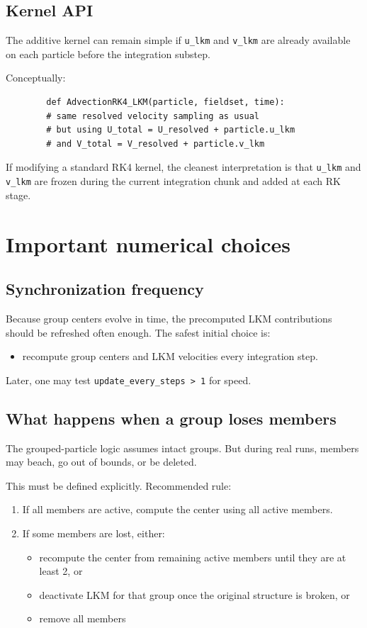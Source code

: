 \documentclass[11pt,a4paper]{article}
\begin{document}
	\subsection{Kernel API}
	
	The additive kernel can remain simple if \texttt{u\_lkm} and \texttt{v\_lkm} are already available on each particle before the integration substep.
	
	Conceptually:
	\begin{verbatim}
		def AdvectionRK4_LKM(particle, fieldset, time):
		# same resolved velocity sampling as usual
		# but using U_total = U_resolved + particle.u_lkm
		# and V_total = V_resolved + particle.v_lkm
	\end{verbatim}
	
	If modifying a standard RK4 kernel, the cleanest interpretation is that \texttt{u\_lkm} and \texttt{v\_lkm} are frozen during the current integration chunk and added at each RK stage.
	
	\section{Important numerical choices}
	
	\subsection{Synchronization frequency}
	
	Because group centers evolve in time, the precomputed LKM contributions should be refreshed often enough. The safest initial choice is:
	\begin{itemize}[leftmargin=1.5em]
		\item recompute group centers and LKM velocities every integration step.
	\end{itemize}
	
	Later, one may test \texttt{update\_every\_steps > 1} for speed.
	
	\subsection{What happens when a group loses members}
	
	The grouped-particle logic assumes intact groups. But during real runs, members may beach, go out of bounds, or be deleted.
	
	This must be defined explicitly. Recommended rule:
	\begin{enumerate}[label=\arabic*.]
		\item If all members are active, compute the center using all active members.
		\item If some members are lost, either:
		\begin{itemize}[leftmargin=1.5em]
			\item recompute the center from remaining active members until they are at least 2, or
			\item deactivate LKM for that group once the original structure is broken, or
			\item remove all members
		\end{itemize}
	\end{enumerate}
	
\end{document}
